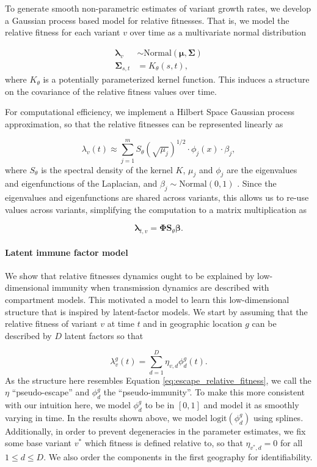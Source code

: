 \documentclass[12pt,oneside,letterpaper]{article}
\renewcommand{\vec}[1]{\boldsymbol{#1}}
\begin{document}
To generate smooth non-parametric estimates of variant growth rates, we develop a Gaussian process based model for relative fitnesses. 
That is, we model the relative fitness for each variant $v$ over time as a multivariate normal distribution

\begin{align*}
    \vec{\lambda}_{v} &\sim \text{Normal}(\vec{\mu}, \vec{\Sigma})\\
    \vec{\Sigma}_{s, t} &= K_{\theta}(s, t),
\end{align*}
where $K_{\theta}$ is a potentially parameterized kernel function. 
This induces a structure on the covariance of the relative fitness values over time.

For computational efficiency, we implement a Hilbert Space Gaussian process approximation, so that the relative fitnesses can be represented linearly as

\begin{equation}
    \lambda_{v}(t) \approx \sum_{j=1}^{m} S_{\theta}(\sqrt{\mu_{j}})^{1/2} \cdot \phi_{j}(x) \cdot \beta_{j},
\end{equation}
where $S_{\theta}$ is the spectral density of the kernel $K$, $\mu_{j}$ and $\phi_{j}$ are the eigenvalues and eigenfunctions of the Laplacian, and $\beta_{j} \sim \text{Normal}(0,1)$ \cite{riutortmayol2022practical}.
Since the eigenvalues and eigenfunctions are shared across variants, this allows us to re-use values across variants, simplifying the computation to a matrix multiplication as

\begin{equation*}
    \vec{\lambda}_{t,v} = \vec{\Phi}\vec{S}_{\theta}\vec{\beta}.
\end{equation*}


\paragraph{Latent immune factor model}%

We show that relative fitnesses dynamics ought to be explained by low-dimensional immunity when transmission dynamics are described with compartment models.
This motivated a model to learn this low-dimensional structure that is inspired by latent-factor models. We start by assuming that the relative fitness of variant $v$ at time $t$ and in geographic location $g$ can be described by $D$ latent factors so that

\begin{equation}
    \lambda_{v}^{g}(t) = \sum_{d=1}^{D} \eta_{v,d} \phi_{d}^{g}(t). 
\end{equation}
As the structure here resembles Equation \ref{eq:escape_relative_fitness}, we call the $\eta$ ``pseudo-escape'' and $\phi_{d}^{g}$ the ``pseudo-immunity''.
To make this more consistent with our intuition here, we model $\phi_{d}^{g}$ to be in $[0,1]$ and model it as smoothly varying in time.
In the results shown above, we model $\text{logit}(\phi_{d}^{g})$ using splines.
Additionally, in order to prevent degeneracies in the parameter estimates, we fix some base variant $v^*$ which fitness is defined relative to, so that $\eta_{v^*, d} = 0$ for all $1\leq d\leq D$.
We also order the components in the first geography for identifiability.
\end{document}
